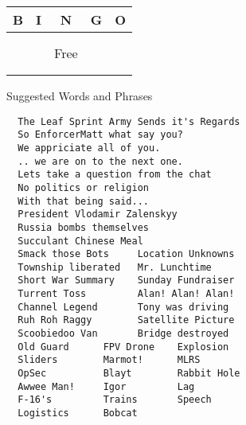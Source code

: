 \begin{multicols}{2}
    
\begin{tabular}{|c|c|c|c|c|}
\multicolumn{1}{c}{\textbf{B}} 
  & \multicolumn{1}{c}{\textbf{I}}
  & \multicolumn{1}{c}{\textbf{N}}
  & \multicolumn{1}{c}{\textbf{G}}
  & \multicolumn{1}{c}{\textbf{O}} \\ \hline
\begin{minipage}{1cm}\hfil\vspace{1cm}\end{minipage}
  & \begin{minipage}{1cm}\hfil\end{minipage}
  & \begin{minipage}{1cm}\hfil\end{minipage}
  & \begin{minipage}{1cm}\hfil\end{minipage}
  & \begin{minipage}{1cm}\hfil\end{minipage}  \\ \hline
\begin{minipage}{3cm}\vspace{1cm}\end{minipage}
      &      &      &      &      \\ \hline
\begin{minipage}{3cm}\vspace{1cm}\end{minipage}
      &      & Free &      &      \\ \hline
\begin{minipage}{3cm}\vspace{1cm}\end{minipage}
      &      &      &      &      \\ \hline
\begin{minipage}{3cm}\vspace{1cm}\end{minipage}
      &      &      &      &      \\ \hline
\end{tabular}

Suggested Words and Phrases

\begin{verbatim}
  The Leaf Sprint Army Sends it's Regards
  So EnforcerMatt what say you?
  We appriciate all of you.
  .. we are on to the next one.
  Lets take a question from the chat
  No politics or religion
  With that being said...
  President Vlodamir Zalenskyy
  Russia bombs themselves
  Succulant Chinese Meal
  Smack those Bots     Location Unknowns
  Township liberated   Mr. Lunchtime
  Short War Summary    Sunday Fundraiser
  Turrent Toss         Alan! Alan! Alan!
  Channel Legend       Tony was driving
  Ruh Roh Raggy        Satellite Picture
  Scoobiedoo Van       Bridge destroyed
  Old Guard      FPV Drone    Explosion
  Sliders        Marmot!      MLRS
  OpSec          Blayt        Rabbit Hole
  Awwee Man!     Igor         Lag
  F-16's         Trains       Speech
  Logistics      Bobcat  
\end{verbatim}

\end{multicols}
